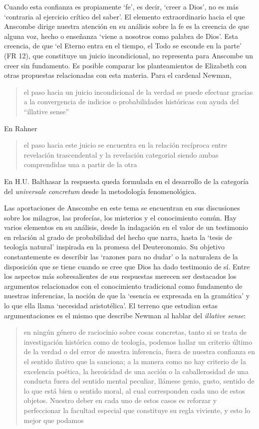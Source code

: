Cuando esta confianza es propiamente `fe', es decir, `creer a Dios', no es más `contraria al ejercicio crítico del saber'. El elemento extraordinario hacia el que Anscombe dirige nuestra atención en su análisis sobre la fe es la creencia de que alguna voz, hecho o enseñanza \enquote*{viene a nosotros como palabra de Dios}. Esta creencia, de que \enquote*{el Eterno entra en el tiempo, el Todo se esconde en la parte} (FR 12), que constituye un juicio incondicional, no representa para Anscombe un creer sin fundamento. Es posible comparar los planteamientos de Elizabeth con otras propuestas relacionadas con esta materia. Para el cardenal Newman, \blockquote[{\Cite[276-277]{ninot2009tf}}]{el paso hacia un juicio incondicional de la verdad se puede efectuar gracias a la convergencia de indicios o probabilidades históricas con ayuda del ``illative sense''}. En Rahner \blockquote[{\Cite[277]{ninot2009tf}}]{el paso hacia este juicio se encuentra en la relación recíproca entre revelación trascendental \textelp{} y la revelación categorial \textelp{} siendo ambas comprendidas una a partir de la otra}. En H.U. Balthasar la respuesta queda formulada en el desarrollo de la categoría del \emph{universale concretum} desde la metodología fenomenológica\autocite[277]{ninot2009tf}.

Las aportaciones de Anscombe en este tema se encuentran en sus discusiones sobre los milagros, las profecías, los misterios y el conocimiento común. Hay varios elementos en su análisis, desde la indagación en el valor de un testimonio en relación al grado de probabilidad del hecho que narra, hasta la `tesis de teología natural' inspirada en la promesa del Deuteronomio. Su objetivo constantemente es describir las `razones para no dudar' o la naturaleza de la disposición que se tiene cuando se cree que Dios ha dado testimonio de sí. Entre los aspectos más sobresalientes de sus respuestas merecen ser destacados los argumentos relacionados con el conocimiento tradicional como fundamento de nuestras inferencias, la noción de que la `esencia es expresada en la gramática' y lo que ella llama `necesidad aristotélica'. El terreno que estudian estas argumentaciones es el mismo que describe Newman al hablar del \emph{illative sense}: \blockquote[{\Cite[317]{newman1870assent}}]{en ningún género de raciocinio sobre cosas concretas, tanto si se trata de investigación histórica como de teología, podemos hallar un criterio último de la verdad o del error de nuestra inferencia, fuera de nuestra confianza en el sentido ilativo que la sanciona; a la manera como no hay criterio de la excelencia poética, la heroicidad de una acción o la caballerosidad de una conducta fuera del sentido mental peculiar, llámese genio, gusto, sentido de lo que está bien o sentido moral, al cual corresponden cada uno de estos objetos. Nuestro deber en cada uno de estos casos es reforzar y perfeccionar la facultad especial que constituye su regla viviente, y esto lo mejor que podamos}.

